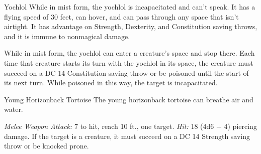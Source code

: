 \documentclass[10pt,a4paper,twoside,bg=print,twocolumn,openany,nodeprecatedcode]{dndbook}
\begin{document}
\begin{DndMonster}[float=t]{Yochlol}
While in mist form, the yochlol is incapacitated and can't speak. It has a flying speed of 30 feet, can hover, and can pass through any space that isn't airtight. It has advantage on Strength, Dexterity, and Constitution saving throws, and it is immune to nonmagical damage.

While in mist form, the yochlol can enter a creature's space and stop there. Each time that creature starts its turn with the yochlol in its space, the creature must succeed on a DC 14 Constitution saving throw or be poisoned until the start of its next turn. While poisoned in this way, the target is incapacitated.

\end{DndMonster}



\begin{DndMonster}[float=t]{Young Horizonback Tortoise}
\DndMonsterBasics[
armor-class = {15 (natural armor)},
hit-points = {\DndDice{8d12 + 16}},
speed = {30 ft.}
]
\DndMonsterAbilityScores[
 str = 19,
 dex = 11,
 con = 15,
 int = 2,
 wis = 12,
 cha = 5
]
\DndMonsterDetails[
languages = {understands Goblin but can't speak},
challenge = 3,
]
The young horizonback tortoise can breathe air and water.

\textsl{Melee Weapon Attack:} 7 to hit, reach 10 ft., one target. \textsl{Hit:} 18 (4d6 + 4) piercing damage. If the target is a creature, it must succeed on a DC 14 Strength saving throw or be knocked prone.

\end{DndMonster}
\end{document}
